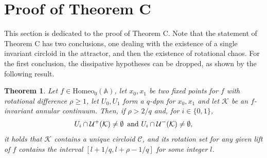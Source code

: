 \documentclass[12pt,a4paper]{amsart}
\newtheorem{thm}{Theorem}[section]
\theoremstyle{definition}
\theoremstyle{remark}
\newcommand{\A}{\mathbb{A}}
\begin{document}
\section{Proof of Theorem C}\label{s.disipative}

This section is dedicated to the proof of Theorem C. Note that the statement of Theorem C has two conclusions, one dealing with the existence of a single invariant circloid in the attractor, and then the existence of rotational chaos. For the first conclusion, the dissipative hypotheses can be dropped, as shown by the following result.

\begin{thm}\label{t.single circloid}
Let \( f \in \mathrm{Homeo}_0(\A) \), let $x_0,x_1$ be two fixed points for $f$ with rotational difference $\rho\ge 1$, let $U_0,U_1$ form a $q$-dpn for $x_0,x_1$ and let $\mathcal{K}$ be an $f$-invariant annular continuum. Then, if $\rho>2/q$ and, for $i\in\{0,1\}$,
$$U_i\cap\mathcal{U}^{+}(\mathcal{K})\not=\emptyset\, \hbox{ and } U_i\cap\mathcal{U}^{-}(\mathcal{K})\not=\emptyset,$$
it holds that $\mathcal{K}$ contains a unique circloid $\mathcal{C}$, and its rotation set for any given lift of $f$ contains the interval $[l+1/q,l+\rho-1/q]$ for some integer $l$.
\end{thm}
\end{document}
